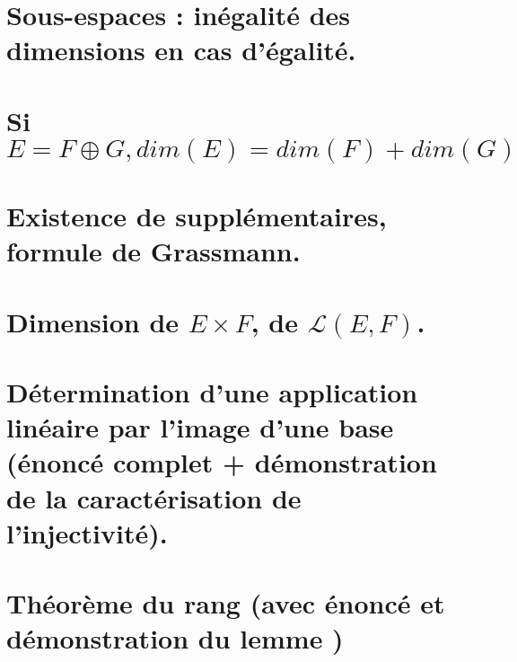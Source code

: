 \documentclass{article}
\begin{document}
\section{Sous-espaces : inégalité des dimensions en cas d'égalité. }
\section{Si $E= F \oplus G, dim(E)=dim(F)+dim(G)$}
\section{Existence de supplémentaires, formule de Grassmann.}
\section{Dimension de $E \times F$, de $\mathcal L(E,F)$.}
\section{Détermination d'une application linéaire par l'image d'une base (énoncé complet + démonstration de la caractérisation de l'injectivité).}
\section{Théorème du rang (avec énoncé et démonstration du lemme )}
\end{document}
